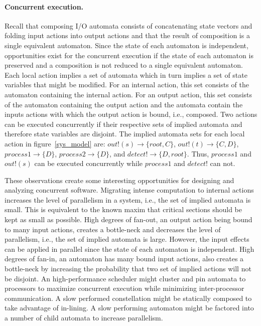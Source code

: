 \paragraph{Concurrent execution.}
Recall that composing I/O automata consists of concatenating state vectors and folding input actions into output actions and that the result of composition is a single equivalent automaton.
Since the state of each automaton is independent, opportunities exist for the concurrent execution if the state of each automaton is preserved and a composition is not reduced to a single equivalent automaton.
Each local action implies a set of automata which in turn implies a set of state variables that might be modified.
For an internal action, this set consists of the automaton containing the internal action.
For an output action, this set consists of the automaton containing the output action and the automata contain the inputs actions with which the output action is bound, i.e., composed.
Two actions can be executed concurrently if their respective sets of implied automata and therefore state variables are disjoint.
The implied automata sets for each local action in figure~\ref{sys_model} are: $out!(s) \to \{root, C\}$, $out!(t) \to \{C, D\}$, $process1 \to \{D\}$, $process2 \to \{D\}$, and $detect! \to \{D, root\}$.
Thus, $process1$ and $out!(s)$ can be executed concurrently while $process1$ and $detect!$ can not.

These observations create some interesting opportunities for designing and analyzing concurrent software.
Migrating intense computation to internal actions increases the level of parallelism in a system, i.e., the set of implied automata is small.
This is equivalent to the known maxim that critical sections should be kept as small as possible.
High degrees of fan-out, an output action being bound to many input actions, creates a bottle-neck and decreases the level of parallelism, i.e., the set of implied automata is large.
However, the input effects can be applied in parallel since the state of each automaton is independent.
High degrees of fan-in, an automaton has many bound input actions, also creates a bottle-neck by increasing the probability that two set of implied actions will not be disjoint.
An high-performance scheduler might cluster and pin automata to processors to maximize concurrent execution while minimizing inter-processor communication.
A slow performed constellation might be statically composed to take advantage of in-lining.
A slow performing automaton might be factored into a number of child automata to increase parallelism.

